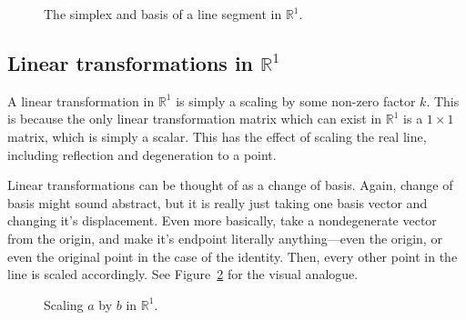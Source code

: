\begin{figure}
    \centering 
    \caption{The simplex and basis of a line segment in \(\mathbb{R}^{1}\).}
    \label{fig:affine-R1linesegment}
\end{figure}

\subsection{Linear transformations in \texorpdfstring{\(\mathbb{R}^{1}\)}{R1}}

A linear transformation in \(\mathbb{R}^{1}\) is simply a scaling
by some non-zero factor \(k\). This is because the only linear
transformation matrix which can exist in \(\mathbb{R}^{1}\) is a
\(1\times1\) matrix, which is simply a scalar. This has the effect of 
scaling the real line, including reflection and degeneration to a point.

Linear transformations can be thought of as a change of basis. Again,
change of basis might sound abstract, but it is really just 
taking one basis vector and changing it's displacement. 
Even more basically, take a nondegenerate vector from the origin, and 
make it's endpoint literally anything---even the origin, or even the 
original point in the case of the identity. Then, every other point 
in the line is scaled accordingly. 
See Figure~\ref{fig:affine-R1lineartransformation} for the visual analogue.

\begin{figure}
    \centering 
    \caption{Scaling \(a\) by \(b\) in \(\mathbb{R}^{1}\).}
    \label{fig:affine-R1lineartransformation}
\end{figure}

